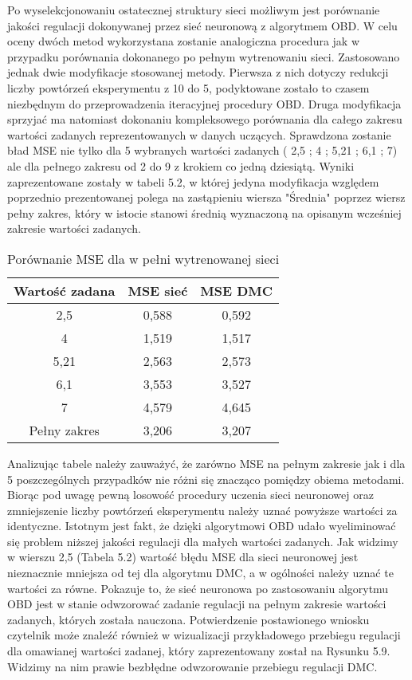 \par Po wyselekcjonowaniu ostatecznej struktury sieci możliwym jest porównanie jakości regulacji dokonywanej przez sieć neuronową z algorytmem OBD. W celu oceny dwóch metod wykorzystana zostanie analogiczna procedura jak w przypadku porównania dokonanego po pełnym wytrenowaniu sieci. Zastosowano jednak dwie modyfikacje stosowanej metody. Pierwsza z nich dotyczy redukcji liczby powtórzeń eksperymentu z 10 do 5, podyktowane zostało to czasem niezbędnym do przeprowadzenia iteracyjnej procedury OBD. Druga modyfikacja sprzyjać ma natomiast dokonaniu kompleksowego porównania dla całego zakresu wartości zadanych reprezentowanych w danych uczących. Sprawdzona zostanie bład MSE nie tylko dla 5 wybranych wartości zadanych ( 2,5 ; 4 ; 5,21 ; 6,1 ; 7) ale dla pełnego zakresu od 2 do 9 z krokiem co jedną dziesiątą. Wyniki zaprezentowane zostały w tabeli 5.2, w której jedyna modyfikacja względem poprzednio prezentowanej polega na zastąpieniu wiersza "Średnia" poprzez wiersz pełny zakres, który w istocie stanowi średnią wyznaczoną na opisanym wcześniej zakresie wartości zadanych.

\begin{table}[!htb] \label{tab:tabela2} \centering
\caption{Porównanie MSE dla w pełni wytrenowanej sieci}
\begin{tabular} {| c | c | c |} \hline
    Wartość zadana & MSE sieć & MSE DMC \\ \hline\hline
    2,5 & 0,588 & 0,592 \\ \hline
    4 & 1,519 & 1,517 \\ \hline
    5,21 & 2,563 & 2,573 \\ \hline
    6,1 & 3,553 & 3,527 \\ \hline
    7 & 4,579 & 4,645 \\ \hline
    Pełny zakres & 3,206  & 3,207 \\ \hline  
\end{tabular}
\end{table}

\par Analizując tabele należy zauważyć, że zarówno MSE na pełnym zakresie jak i dla 5 poszczególnych przypadków nie różni się znacząco pomiędzy obiema metodami. Biorąc pod uwagę pewną losowość procedury uczenia sieci neuronowej oraz zmniejszenie liczby powtórzeń eksperymentu należy uznać powyższe wartości za identyczne. Istotnym jest fakt, że dzięki algorytmowi OBD udało wyeliminować się problem niższej jakości regulacji dla małych wartości zadanych. Jak widzimy w wierszu 2,5 (Tabela 5.2)  wartość błędu MSE dla sieci neuronowej jest nieznacznie mniejsza od tej dla algorytmu DMC, a w ogólności należy uznać te wartości za równe. Pokazuje to, że sieć neuronowa po zastosowaniu algorytmu OBD jest w stanie odwzorować zadanie regulacji na pełnym zakresie wartości zadanych, których została nauczona. Potwierdzenie postawionego wniosku czytelnik może znaleźć również w wizualizacji przykładowego przebiegu regulacji dla omawianej wartości zadanej, który zaprezentowany został na Rysunku 5.9. Widzimy na nim prawie bezbłędne odwzorowanie przebiegu regulacji DMC. 

